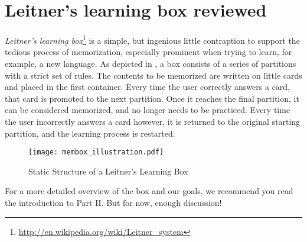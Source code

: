 \section{Leitner's learning box reviewed}

\emph{Leitner's learning box}\footnote{\href{http://en.wikipedia.org/wiki/Leitner\_system}{http://en.wikipedia.org/wiki/Leitner\_system}} is a simple, but
ingenious little contraption to support the tedious process of memorization, especially prominent when trying to learn, for example, a new language. As depicted
in , a box consists of a series of partitions with a strict set of rules. The contents to be memorized are written on little
cards and placed in the first container. Every time the user correctly answers a card, that card is promoted to the next partition. Once it reaches the final
partition, it can be considered memorized, and no longer needs to be practiced. Every time the user incorrectly answers a card however, it is returned to the
original starting partition, and the learning process is restarted.

\begin{figure}[htbp]
	\centering
  \texttt{[image: membox\_illustration.pdf]}
	\caption{Static Structure of a Leitner's Learning Box}
	\label{fig:membox_depiction}
\end{figure}

For a more detailed overview of the box and our goals, we recommend you read the introduction to Part II. But for now, enough discussion!

